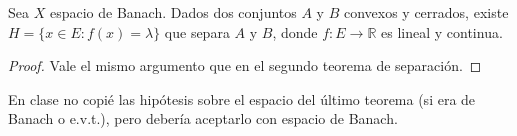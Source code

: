 \begin{theorem}
  \label{th:h-b-geom}
  Sea $X$ espacio de Banach. Dados dos conjuntos $A$ y $B$ convexos y cerrados,
  existe $H=\{x\in E:f(x)=\lambda\} $ que separa $A$ y $B$, donde $f:E\to
  \mathbb{R}$ es lineal y continua.
\end{theorem}
\begin{proof}
  Vale el mismo argumento que en el segundo teorema de separación.
\end{proof}

\begin{remark}
  En clase no copié las hipótesis sobre el espacio del último teorema (si era de
  Banach o e.v.t.), pero debería aceptarlo con espacio de Banach.
\end{remark}
